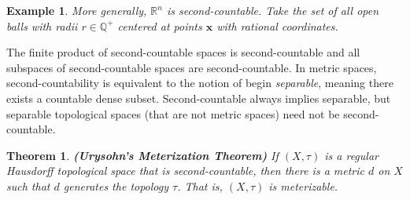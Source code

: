 \documentclass{article}
\theoremstyle{plain}
\newtheorem{theorem}{Theorem}[section]
\theoremstyle{normal}
\newtheorem{example}{Example}[section]
\begin{document}
        \begin{example}
            More generally, $\mathbb{R}^{n}$ is second-countable. Take the set
            of all open balls with radii $r\in\mathbb{Q}^{+}$ centered at
            points $\mathbf{x}$ with rational coordinates.
        \end{example}
        The finite product of second-countable spaces is second-countable
        and all subspaces of second-countable spaces are second-countable.
        In metric spaces, second-countability is equivalent to the notion of
        begin \textit{separable}, meaning there exists a countable dense
        subset. Second-countable always implies separable, but separable
        topological spaces (that are not metric spaces) need not be
        second-countable.
        \begin{theorem}{\textbf{(Urysohn's Meterization Theorem)}}
            If $(X,\tau)$ is a regular Hausdorff topological space that is
            second-countable, then there is a metric $d$ on $X$ such that
            $d$ generates the topology $\tau$. That is, $(X,\tau)$ is
            meterizable.
        \end{theorem}
\end{document}
